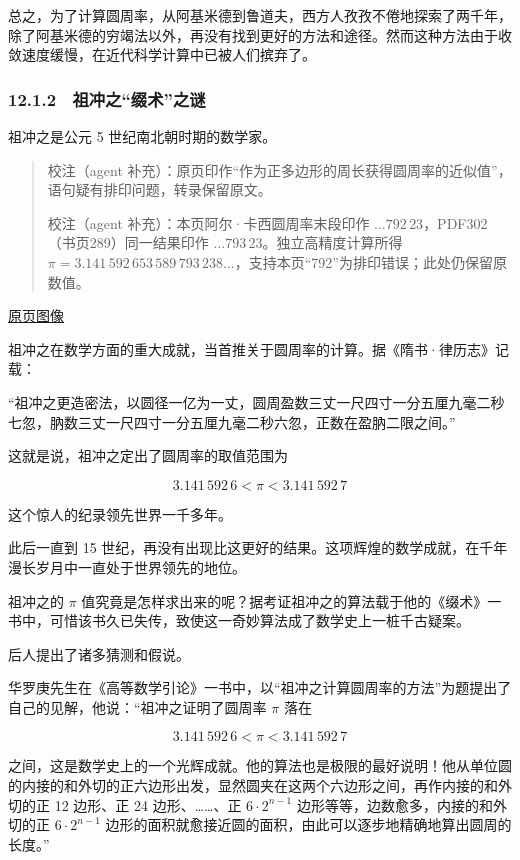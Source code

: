 \documentclass[
  10pt,
  fontset=fandol]{ctexart}
\begin{document}
总之，为了计算圆周率，从阿基米德到鲁道夫，西方人孜孜不倦地探索了两千年，除了阿基米德的穷竭法以外，再没有找到更好的方法和途径。然而这种方法由于收敛速度缓慢，在近代科学计算中已被人们摈弃了。

\subsubsection{12.1.2　祖冲之``缀术''之谜}\label{ux7956ux51b2ux4e4bux7f00ux672fux4e4bux8c1c}

祖冲之是公元 5 世纪南北朝时期的数学家。

\begin{quote}
校注（agent 补充）：原页印作``作为正多边形的周长获得圆周率的近似值''，语句疑有排印问题，转录保留原文。

校注（agent 补充）：本页阿尔·卡西圆周率末段印作 \(\ldots792\,23\)，PDF302（书页289）同一结果印作 \(\ldots793\,23\)。独立高精度计算所得 \(\pi=3.141\,592\,653\,589\,793\,238\ldots\)，支持本页``792''为排印错误；此处仍保留原数值。
\end{quote}

\href{../../source-images/pdf-295.jpeg}{原页图像}

祖冲之在数学方面的重大成就，当首推关于圆周率的计算。据《隋书·律历志》记载：

``祖冲之更造密法，以圆径一亿为一丈，圆周盈数三丈一尺四寸一分五厘九毫二秒七忽，肭数三丈一尺四寸一分五厘九毫二秒六忽，正数在盈肭二限之间。''

这就是说，祖冲之定出了圆周率的取值范围为

\[
3.141\,592\,6<\pi<3.141\,592\,7
\]

这个惊人的纪录领先世界一千多年。

此后一直到 15 世纪，再没有出现比这更好的结果。这项辉煌的数学成就，在千年漫长岁月中一直处于世界领先的地位。

祖冲之的 \(\pi\) 值究竟是怎样求出来的呢？据考证祖冲之的算法载于他的《缀术》一书中，可惜该书久已失传，致使这一奇妙算法成了数学史上一桩千古疑案。

后人提出了诸多猜测和假说。

华罗庚先生在《高等数学引论》一书中，以``祖冲之计算圆周率的方法''为题提出了自己的见解，他说：``祖冲之证明了圆周率 \(\pi\) 落在

\[
3.141\,592\,6<\pi<3.141\,592\,7
\]

之间，这是数学史上的一个光辉成就。他的算法也是极限的最好说明！他从单位圆的内接的和外切的正六边形出发，显然圆夹在这两个六边形之间，再作内接的和外切的正 12 边形、正 24 边形、\ldots\ldots、正 \(6\cdot2^{n-1}\) 边形等等，边数愈多，内接的和外切的正 \(6\cdot2^{n-1}\) 边形的面积就愈接近圆的面积，由此可以逐步地精确地算出圆周的长度。''
\end{document}

